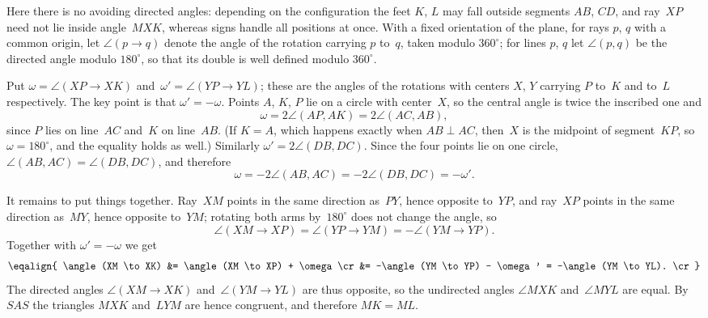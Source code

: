 {    Here there is no avoiding directed angles: depending on the configuration the feet $K$, $L$ may fall outside segments $AB$, $CD$, and ray~$XP$ need not lie inside angle~$MXK$, whereas signs handle all positions at once. With a fixed orientation of the plane, for rays $p$, $q$ with a common origin, let $\angle(p \to q)$ denote the angle of the rotation carrying $p$ to~$q$, taken modulo $360^\circ$; for lines $p$, $q$ let $\angle(p,q)$ be the directed angle modulo $180^\circ$, so that its double is well defined modulo $360^\circ$.

    Put $\omega = \angle(XP \to XK)$ and~$\omega' = \angle(YP \to YL)$; these are the angles of the rotations with centers $X$, $Y$ carrying $P$ to~$K$ and to~$L$ respectively. The key point is that $\omega' = -\omega$. Points $A$, $K$, $P$ lie on a circle with center~$X$, so the central angle is twice the inscribed one and
    $$
    \omega = 2\angle(AP,AK) = 2\angle(AC,AB),
    $$
    since $P$ lies on line~$AC$ and~$K$ on line~$AB$. (If $K = A$, which happens exactly when $AB \perp AC$, then~$X$ is the midpoint of segment~$KP$, so $\omega = 180^\circ$, and the equality holds as well.) Similarly $\omega' = 2\angle(DB,DC)$. Since the four points lie on one circle, $\angle(AB,AC) = \angle(DB,DC)$, and therefore
    $$
    \omega = -2\angle(AB,AC) = -2\angle(DB,DC) = -\omega'.
    $$

    It remains to put things together. Ray~$XM$ points in the same direction as~$PY$, hence opposite to~$YP$, and ray~$XP$ points in the same direction as~$MY$, hence opposite to~$YM$; rotating both arms by~$180^\circ$ does not change the angle, so
    $$
    \angle(XM \to XP) = \angle(YP \to YM) = -\angle(YM \to YP).
    $$
    Together with $\omega' = -\omega$ we get
    $$
    \eqalign{
        \angle(XM \to XK) &= \angle(XM \to XP) + \omega \cr
        &= -\angle(YM \to YP) - \omega' = -\angle(YM \to YL). \cr
    }
    $$
    The directed angles $\angle(XM \to XK)$ and~$\angle(YM \to YL)$ are thus opposite, so the undirected angles $\angle MXK$ and~$\angle MYL$ are equal. By~$SAS$ the triangles $MXK$ and~$LYM$ are hence congruent, and therefore $MK = ML$.
}

